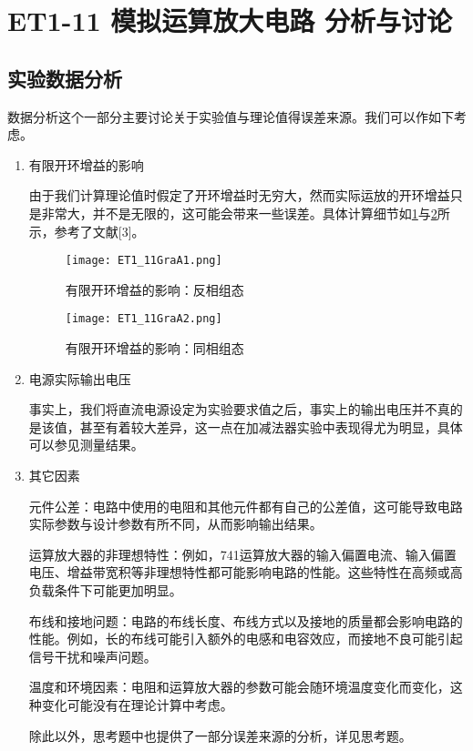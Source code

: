 \documentclass[dvipsnames, svgnames,a4paper,11pt]{article}
\begin{document}
	\section{ET1-11 模拟运算放大电路 \quad\heiti 分析与讨论}
	
	\subsection{实验数据分析}
	
	数据分析这个一部分主要讨论关于实验值与理论值得误差来源。我们可以作如下考虑。
	
	\begin{enumerate}
		\item 有限开环增益的影响
		
		由于我们计算理论值时假定了开环增益时无穷大，然而实际运放的开环增益只是非常大，并不是无限的，这可能会带来一些误差。具体计算细节如\cref{fig:figA1}与\cref{fig:figA2}所示，参考了文献[3]。
		
		\begin{figure}[htbp]
			\centering
			\texttt{[image: ET1\_11GraA1.png]}
			\caption{有限开环增益的影响：反相组态}
			\label{fig:figA1}
		\end{figure}
		
		\begin{figure}[htbp]
			\centering
			\texttt{[image: ET1\_11GraA2.png]}
			\caption{有限开环增益的影响：同相组态}
			\label{fig:figA2}
		\end{figure}
		
		\item 电源实际输出电压
		
		事实上，我们将直流电源设定为实验要求值之后，事实上的输出电压并不真的是该值，甚至有着较大差异，这一点在加减法器实验中表现得尤为明显，具体可以参见测量结果。
		
		\item 其它因素
		
		元件公差：电路中使用的电阻和其他元件都有自己的公差值，这可能导致电路实际参数与设计参数有所不同，从而影响输出结果。
		
		运算放大器的非理想特性：例如，741运算放大器的输入偏置电流、输入偏置电压、增益带宽积等非理想特性都可能影响电路的性能。这些特性在高频或高负载条件下可能更加明显。
		
		布线和接地问题：电路的布线长度、布线方式以及接地的质量都会影响电路的性能。例如，长的布线可能引入额外的电感和电容效应，而接地不良可能引起信号干扰和噪声问题。
		
		温度和环境因素：电阻和运算放大器的参数可能会随环境温度变化而变化，这种变化可能没有在理论计算中考虑。
		
		除此以外，思考题中也提供了一部分误差来源的分析，详见思考题。
	\end{enumerate}
	
\end{document}
